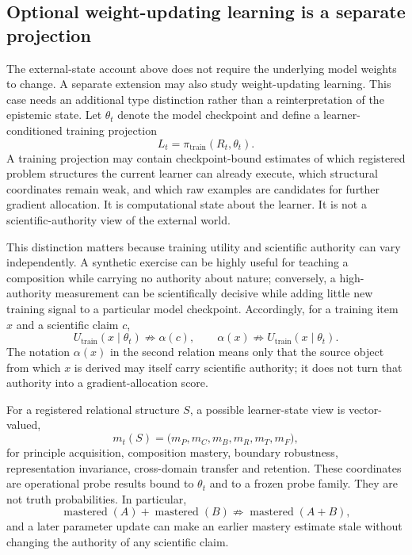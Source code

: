 \subsection{Optional weight-updating learning is a separate projection}
\label{sec:training-time-projection}

The external-state account above does not require the underlying model weights to change.  A separate extension may also study weight-updating learning.  This case needs an additional type distinction rather than a reinterpretation of the epistemic state.  Let $\theta_t$ denote the model checkpoint and define a learner-conditioned training projection
\[
L_t=\pi_{\mathrm{train}}(R_t,\theta_t).
\]
A training projection may contain checkpoint-bound estimates of which registered problem structures the current learner can already execute, which structural coordinates remain weak, and which raw examples are candidates for further gradient allocation.  It is computational state about the learner.  It is not a scientific-authority view of the external world.

This distinction matters because training utility and scientific authority can vary independently.  A synthetic exercise can be highly useful for teaching a composition while carrying no authority about nature; conversely, a high-authority measurement can be scientifically decisive while adding little new training signal to a particular model checkpoint.  Accordingly, for a training item $x$ and a scientific claim $c$,
\[
U_{\mathrm{train}}(x\mid\theta_t)\not\Rightarrow \alpha(c),
\qquad
\alpha(x)\not\Rightarrow U_{\mathrm{train}}(x\mid\theta_t).
\]
The notation $\alpha(x)$ in the second relation means only that the source object from which $x$ is derived may itself carry scientific authority; it does not turn that authority into a gradient-allocation score.

For a registered relational structure $S$, a possible learner-state view is vector-valued,
\[
m_t(S)=\bigl(m_P,m_C,m_B,m_R,m_T,m_F\bigr),
\]
for principle acquisition, composition mastery, boundary robustness, representation invariance, cross-domain transfer and retention.  These coordinates are operational probe results bound to $\theta_t$ and to a frozen probe family.  They are not truth probabilities.  In particular,
\[
\operatorname{mastered}(A)+\operatorname{mastered}(B)
\not\Rightarrow
\operatorname{mastered}(A+B),
\]
and a later parameter update can make an earlier mastery estimate stale without changing the authority of any scientific claim.

